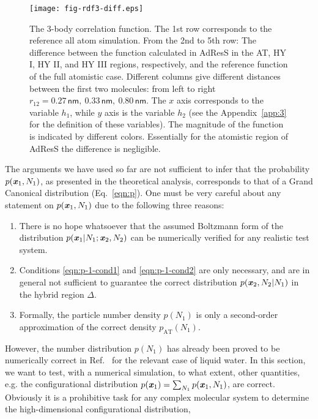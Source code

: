 \documentclass[aps,a4paper,reprint,onecolumn]{revtex4}
\newcommand{\vect}[1]{\textbf{\textit{#1}}}
\newcommand{\AT}{{\textrm{{AT}}}}
\newcommand{\HY}{{\Delta}}
\begin{document}
\begin{figure}
  \centering
  \texttt{[image: fig-rdf3-diff.eps]}
  \caption{The 3-body correlation function.  The 1st row corresponds to the reference all atom simulation.
    From the 2nd to 5th row:
    The difference between the function calculated in AdResS in the AT, HY I, HY II, and HY III
    regions, respectively, and the reference function of the full atomistic case.
    Different columns give different distances between
    the first two molecules: from left to right $r_{12} =
    0.27\,\textsf{nm},\ 0.33\,\textsf{nm},\  
    0.80\,\textsf{nm}$.  The $x$ axis corresponds to the variable $h_1$, while $y$
    axis is the variable $h_2$ (see the Appendix~\ref{app:3} for the
    definition of these variables).  The magnitude of the function is indicated by
    different colors. Essentially for the atomistic region of AdResS the difference is negligible.
  }
  \label{fig:tmp2b}
\end{figure}
The arguments we have used so far are not sufficient to infer that the probability $p(\vect x_1 , N_1)$,
as presented in the theoretical analysis, corresponds to that of a Grand Canonical distribution  (Eq.~\eqref{eqn:p}).
One must be very careful about any statement on $p(\vect x_1, N_1)$ 
due to the following three reasons:
\begin{enumerate}
\item There is no hope whatsoever that the assumed Boltzmann form of the distribution $p(\vect x_1|N_1; \vect x_2, N_2)$ can be numerically verified  for any realistic test system. 
\item Conditions \eqref{eqn:p-1-cond1} and \eqref{eqn:p-1-cond2}
are only necessary, and are in general not sufficient to guarantee
the correct distribution $p(\vect x_2, N_2 | N_1)$ in the hybrid region $\HY$.
\item Formally, the particle number density $p(N_1)$ is only a second-order approximation of the correct density $p_{\AT}(N_{1})$.
\end{enumerate}
However, the number distribution $p(N_1)$ has already
been proved to be numerically correct in Ref.~\cite{prlgc, rdfcorr} for the relevant case of liquid water. In this section, we want to test, with a numerical simulation, to what extent, other quantities, e.g. the configurational distribution $p(\vect x_1) = \sum_{N_1}p(\vect x_1, N_1)$, are correct. 
Obviously it is a prohibitive task for any complex molecular system to determine the high-dimensional configurational distribution,
\end{document}
